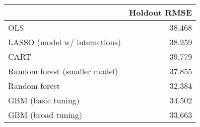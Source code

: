 
\begin{tabular}{lr}
\toprule
  & Holdout RMSE\\
\midrule
OLS & 38.468\\
LASSO (model w/ interactions) & 38.259\\
CART & 39.779\\
Random forest (smaller model) & 37.855\\
Random forest & 32.384\\
GBM (basic tuning) & 34.502\\
GBM (broad tuning) & 33.663\\
\bottomrule
\end{tabular}